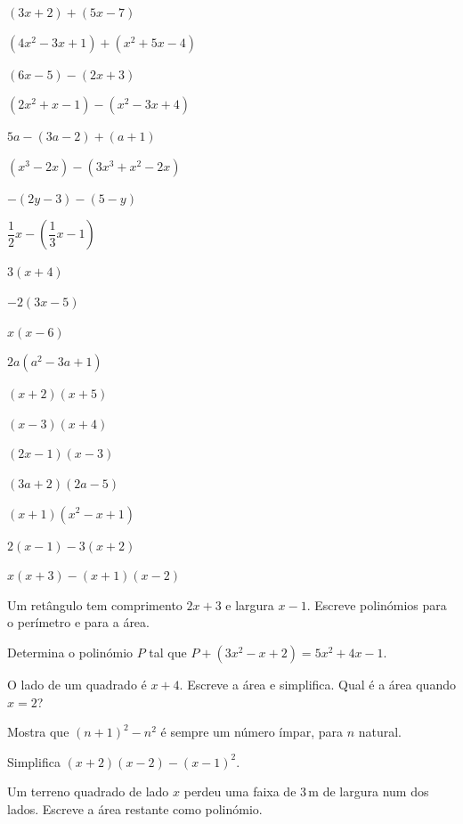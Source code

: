 \documentclass[12pt]{article}
\begin{document}
\begin{exercicios}
  \item $(3x + 2) + (5x - 7)$
  \item $(4x^2 - 3x + 1) + (x^2 + 5x - 4)$
  \item $(6x - 5) - (2x + 3)$
  \item $(2x^2 + x - 1) - (x^2 - 3x + 4)$
  \item $5a - (3a - 2) + (a + 1)$
  \item $(x^3 - 2x) - (3x^3 + x^2 - 2x)$
  \item $-(2y - 3) - (5 - y)$
  \item $\dfrac{1}{2}x - \left(\dfrac{1}{3}x - 1\right)$
\end{exercicios}

\begin{exercicios}
  \item $3(x + 4)$
  \item $-2(3x - 5)$
  \item $x(x - 6)$
  \item $2a(a^2 - 3a + 1)$
  \item $(x + 2)(x + 5)$
  \item $(x - 3)(x + 4)$
  \item $(2x - 1)(x - 3)$
  \item $(3a + 2)(2a - 5)$
  \item $(x + 1)(x^2 - x + 1)$
  \item $2(x - 1) - 3(x + 2)$
  \item $x(x + 3) - (x + 1)(x - 2)$
\end{exercicios}

\begin{exercicios}
  \item Um retângulo tem comprimento $2x + 3$ e largura $x - 1$. Escreve polinómios para o perímetro e para a área.
  \item Determina o polinómio $P$ tal que $P + (3x^2 - x + 2) = 5x^2 + 4x - 1$.
  \item O lado de um quadrado é $x + 4$. Escreve a área e simplifica. Qual é a área quando $x = 2$?
  \item Mostra que $(n + 1)^2 - n^2$ é sempre um número ímpar, para $n$ natural.
  \item Simplifica $(x + 2)(x - 2) - (x - 1)^2$.
  \item Um terreno quadrado de lado $x$ perdeu uma faixa de 3\,m de largura num dos lados. Escreve a área restante como polinómio.
\end{exercicios}
\end{document}

